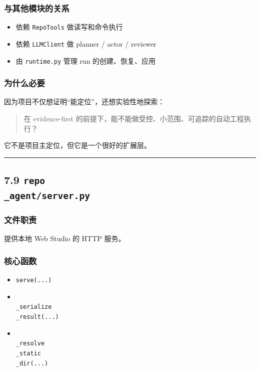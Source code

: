 \documentclass[UTF8,12pt,openany]{ctexbook}
\begin{document}
\subsubsection{与其他模块的关系}

\begin{itemize}
\item 依赖 \texttt{RepoTools} 做读写和命令执行
\item 依赖 \texttt{LLMClient} 做 planner / actor / reviewer
\item 由 \texttt{runtime.py} 管理 run 的创建、恢复、应用
\end{itemize}

\subsubsection{为什么必要}

因为项目不仅想证明“能定位”，还想实验性地探索：\par

\begin{quote}
在 evidence-first 的前提下，能不能做受控、小范围、可追踪的自动工程执行？
\end{quote}

它不是项目主定位，但它是一个很好的扩展层。\par

\hrule

\subsection{7.9 \texttt{repo\\_agent/server.py}}

\subsubsection{文件职责}

提供本地 Web Studio 的 HTTP 服务。\par

\subsubsection{核心函数}

\begin{itemize}
\item \texttt{serve(...)}
\item \texttt{\\_serialize\\_result(...)}
\item \texttt{\\_resolve\\_static\\_dir(...)}
\end{itemize}
\end{document}
